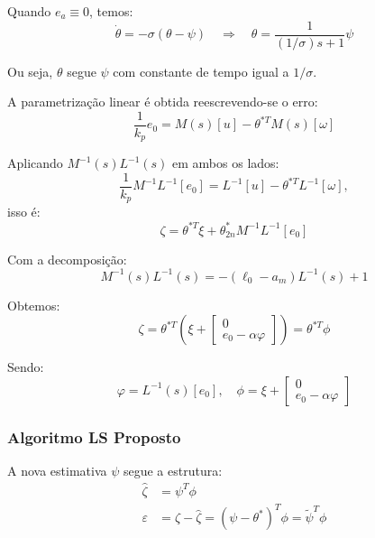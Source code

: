 \documentclass[10pt]{article}
\begin{document}
Quando \(e_a \equiv 0\), temos:
\begin{equation}
    \dot{\theta} = -\sigma (\theta - \psi) \quad \Rightarrow \quad \theta = \frac{1}{(1/\sigma)s + 1} \psi
\end{equation}

Ou seja, \(\theta\) segue \(\psi\) com constante de tempo igual a \(1/\sigma\).

A parametrização linear é obtida reescrevendo-se o erro:
\begin{equation}
    \frac{1}{k_p} e_0 = M(s)[u] - \theta^{*T} M(s)[\omega]
\end{equation}

Aplicando \(M^{-1}(s) L^{-1}(s)\) em ambos os lados:
\begin{equation}
    \frac{1}{k_p} M^{-1} L^{-1} [e_0] = L^{-1} [u] - \theta^{*T} L^{-1} [\omega],
\end{equation}
isso é:
\begin{equation}
    \zeta = \theta^{*T} \xi + \theta^*_{2n} M^{-1} L^{-1} [e_0]
\end{equation}

Com a decomposição:
\begin{equation}
    M^{-1}(s)L^{-1}(s) = -(\ell_0 - a_m) L^{-1}(s) + 1
\end{equation}

Obtemos:
\begin{equation}
    \zeta = \theta^{*T} \left(\xi + \begin{bmatrix} 0 \\ e_0 - \alpha \varphi \end{bmatrix}\right) = \theta^{*T} \phi
\end{equation}

Sendo:
\begin{equation}
    \varphi = L^{-1}(s)[e_0], \quad \phi = \xi + \begin{bmatrix} 0 \\ e_0 - \alpha \varphi \end{bmatrix}
\end{equation}

\subsubsection{Algoritmo LS Proposto}

A nova estimativa \(\psi\) segue a estrutura:
\begin{align}
    \hat{\zeta} &= \psi^T \phi \\
    \varepsilon &= \zeta - \hat{\zeta} = (\psi - \theta^*)^T \phi = \tilde{\psi}^T \phi
\end{align}
\end{document}
